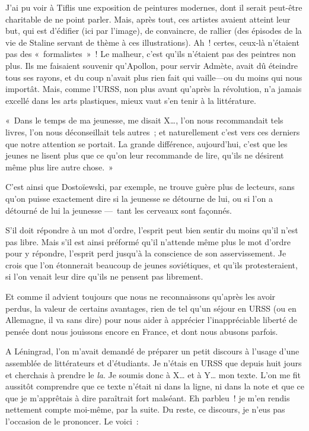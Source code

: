 \documentclass[french,twoside]{book} %
\begin{document}
\noindent J’ai pu voir à Tiflis une exposition de peintures modernes, dont il serait peut-être charitable de ne point parler. Mais, après tout, ces artistes avaient atteint leur but, qui est d’édifier (ici par l’image), de convaincre, de rallier (des épisodes de la vie de Staline servant de thème à ces illustrations). Ah ! certes, ceux-là n’étaient pas des « formalistes » ! Le malheur, c’est qu’ils n’étaient pas des peintres non plus. Ils me faisaient souvenir qu’Apollon, pour servir Admète, avait dû éteindre tous ses rayons, et du coup n’avait plus rien fait qui vaille—ou du moins qui nous importât. Mais, comme l’URSS, non plus avant qu’après la révolution, n’a jamais excellé dans les arts plastiques, mieux vaut s’en tenir à la littérature.\par
« Dans le temps de ma jeunesse, me disait X…, l’on nous recommandait tels livres, l’on nous déconseillait tels autres ; et naturellement c’est vers ces derniers que notre attention se portait. La grande différence, aujourd’hui, c’est que les jeunes ne lisent plus que ce qu’on leur recommande de lire, qu’ils ne désirent même plus lire autre chose. »\par
C’est ainsi que Dostoïewski, par exemple, ne trouve guère plus de lecteurs, sans qu’on puisse exactement dire si la jeunesse se détourne de lui, ou si l’on a détourné de lui la jeunesse — tant les cerveaux sont façonnés.\par
S’il doit répondre à un mot d’ordre, l’esprit peut bien sentir du moins qu’il n’est pas libre. Mais s’il est ainsi préformé qu’il n’attende même plus le mot d’ordre pour y répondre, l’esprit perd jusqu’à la conscience de son asservissement. Je crois que l’on étonnerait beaucoup de jeunes soviétiques, et qu’ils protesteraient, si l’on venait leur dire qu’ils ne pensent pas librement.\par
Et comme il advient toujours que nous ne reconnaissons qu’après les avoir perdus, la valeur de certains avantages, rien de tel qu’un séjour en URSS (ou en Allemagne, il va sans dire) pour nous aider à apprécier l’inappréciable liberté de pensée dont nous jouissons encore en France, et dont nous abusons parfois.\par
A Léningrad, l’on m’avait demandé de préparer un petit discours à l’usage d’une assemblée de littérateurs et d’étudiants. Je n’étais en URSS que depuis huit jours et cherchais à prendre le \emph{la}. Je soumis donc à X… et à Y… mon texte. L’on me fit aussitôt comprendre que ce texte n’était ni dans la ligne, ni dans la note et que ce que je m’apprêtais à dire paraîtrait fort malséant. Eh parbleu ! je m’en rendis nettement compte moi-même, par la suite. Du reste, ce discours, je n’eus pas l’occasion de le prononcer. Le voici :\par
\end{document}
